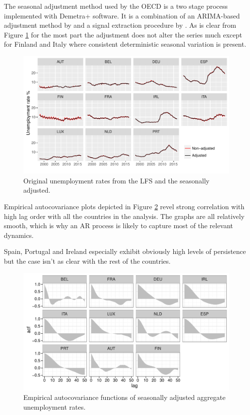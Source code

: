 \documentclass[12pt,a4paper,english]{article}
\begin{document}
The seasonal adjustment method used by the OECD is a two stage process implemented with Demetra+ software. It is a combination of an ARIMA-based adjustment method by \cite{TRAMO} and a signal extraction procedure by \cite{SEATS}. As is clear from Figure \ref{ST_STSA_facet} for the most part the adjustment does not alter the series much except for Finland and Italy where consistent deterministic seasonal variation is present.

\begin{figure}
\vspace{1.5cm}
\centering
\includegraphics[width=0.9\linewidth]{Graphs/ST_STSA_TT_facet}
\caption{Original unemployment rates from the LFS and the seasonally adjusted.\cite{oecdSTLABOUR}}
\label{ST_STSA_facet}
\vspace{1.5cm}
\end{figure}



Empirical autocovariance plots depicted in Figure \ref{STSA_ACF_facet} revel strong correlation with high lag order with all the countries in the analysis. The graphs are all relatively smooth, which is why an AR process is likely to capture most of the relevant dynamics.

Spain, Portugal and Ireland especially exhibit obviously high levels of persistence but the case isn't as clear with the rest of the countries.

\begin{figure}
\vspace{1.5cm}
\centering
\includegraphics[width=0.9\linewidth]{Graphs/STSA_TT_ACF_facet}
\caption{Empirical autocovariance functions of seasonally adjusted aggregate unemployment rates.\cite{oecdSTLABOUR}}
\label{STSA_ACF_facet}
\vspace{1.5cm}
\end{figure}
\end{document}
